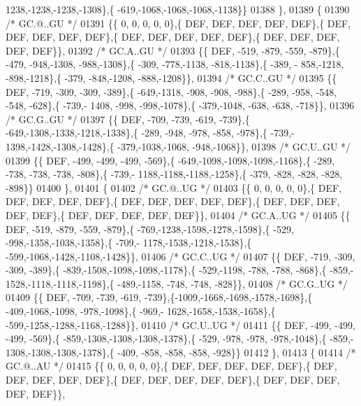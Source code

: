 \begin{DoxyCode}
      1238,-1238,-1238,-1308\},\{ -619,-1068,-1068,-1068,-1138\}\}
01388 \},
01389 \{
01390 \textcolor{comment}{/* GC.@..GU */}
01391 \{\{    0,    0,    0,    0,    0\},\{  DEF,  DEF,  DEF,  DEF,  DEF\},\{  DEF,  DEF,  DEF,  DEF,  DEF\},\{  DEF,  
      DEF,  DEF,  DEF,  DEF\},\{  DEF,  DEF,  DEF,  DEF,  DEF\}\},
01392 \textcolor{comment}{/* GC.A..GU */}
01393 \{\{  DEF, -519, -879, -559, -879\},\{ -479, -948,-1308, -988,-1308\},\{ -309, -778,-1138, -818,-1138\},\{ -389, -
      858,-1218, -898,-1218\},\{ -379, -848,-1208, -888,-1208\}\},
01394 \textcolor{comment}{/* GC.C..GU */}
01395 \{\{  DEF, -719, -309, -309, -389\},\{ -649,-1318, -908, -908, -988\},\{ -289, -958, -548, -548, -628\},\{ -739,-
      1408, -998, -998,-1078\},\{ -379,-1048, -638, -638, -718\}\},
01396 \textcolor{comment}{/* GC.G..GU */}
01397 \{\{  DEF, -709, -739, -619, -739\},\{ -649,-1308,-1338,-1218,-1338\},\{ -289, -948, -978, -858, -978\},\{ -739,-
      1398,-1428,-1308,-1428\},\{ -379,-1038,-1068, -948,-1068\}\},
01398 \textcolor{comment}{/* GC.U..GU */}
01399 \{\{  DEF, -499, -499, -499, -569\},\{ -649,-1098,-1098,-1098,-1168\},\{ -289, -738, -738, -738, -808\},\{ -739,-
      1188,-1188,-1188,-1258\},\{ -379, -828, -828, -828, -898\}\}
01400 \},
01401 \{
01402 \textcolor{comment}{/* GC.@..UG */}
01403 \{\{    0,    0,    0,    0,    0\},\{  DEF,  DEF,  DEF,  DEF,  DEF\},\{  DEF,  DEF,  DEF,  DEF,  DEF\},\{  DEF,  
      DEF,  DEF,  DEF,  DEF\},\{  DEF,  DEF,  DEF,  DEF,  DEF\}\},
01404 \textcolor{comment}{/* GC.A..UG */}
01405 \{\{  DEF, -519, -879, -559, -879\},\{ -769,-1238,-1598,-1278,-1598\},\{ -529, -998,-1358,-1038,-1358\},\{ -709,-
      1178,-1538,-1218,-1538\},\{ -599,-1068,-1428,-1108,-1428\}\},
01406 \textcolor{comment}{/* GC.C..UG */}
01407 \{\{  DEF, -719, -309, -309, -389\},\{ -839,-1508,-1098,-1098,-1178\},\{ -529,-1198, -788, -788, -868\},\{ -859,-
      1528,-1118,-1118,-1198\},\{ -489,-1158, -748, -748, -828\}\},
01408 \textcolor{comment}{/* GC.G..UG */}
01409 \{\{  DEF, -709, -739, -619, -739\},\{-1009,-1668,-1698,-1578,-1698\},\{ -409,-1068,-1098, -978,-1098\},\{ -969,-
      1628,-1658,-1538,-1658\},\{ -599,-1258,-1288,-1168,-1288\}\},
01410 \textcolor{comment}{/* GC.U..UG */}
01411 \{\{  DEF, -499, -499, -499, -569\},\{ -859,-1308,-1308,-1308,-1378\},\{ -529, -978, -978, -978,-1048\},\{ -859,-
      1308,-1308,-1308,-1378\},\{ -409, -858, -858, -858, -928\}\}
01412 \},
01413 \{
01414 \textcolor{comment}{/* GC.@..AU */}
01415 \{\{    0,    0,    0,    0,    0\},\{  DEF,  DEF,  DEF,  DEF,  DEF\},\{  DEF,  DEF,  DEF,  DEF,  DEF\},\{  DEF,  
      DEF,  DEF,  DEF,  DEF\},\{  DEF,  DEF,  DEF,  DEF,  DEF\}\},

\end{DoxyCode}

